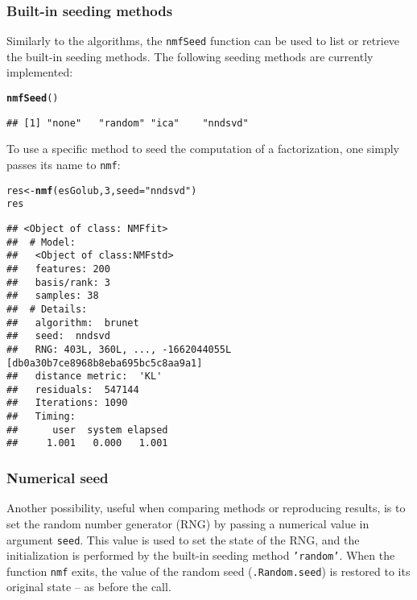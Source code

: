 \documentclass[a4paper]{article}\usepackage{graphicx, color}
\makeatletter
\newcommand{\hlfunctioncall}[1]{\textcolor[rgb]{0.501960784313725,0,0.329411764705882}{\textbf{#1}}}%
\newcommand{\hlstring}[1]{\textcolor[rgb]{0.6,0.6,1}{#1}}%
\newenvironment{kframe}{%
 \def\at@end@of@kframe{}%
 \ifinner\ifhmode%
  \def\at@end@of@kframe{\end{minipage}}%
  \begin{minipage}{\columnwidth}%
 \fi\fi%
 \def\FrameCommand##1{\hskip\@totalleftmargin \hskip-\fboxsep
 \colorbox{shadecolor}{##1}\hskip-\fboxsep
     \hskip-\linewidth \hskip-\@totalleftmargin \hskip\columnwidth}%
 \MakeFramed {\advance\hsize-\width
   \@totalleftmargin\z@ \linewidth\hsize
   \@setminipage}}%
 {\par\unskip\endMakeFramed%
 \at@end@of@kframe}
\newenvironment{knitrout}{}{} %
\let\code=\texttt
\makeatother
\begin{document}
\subsubsection{Built-in seeding methods}
Similarly to the algorithms, the \code{nmfSeed} function can be used to list or retrieve the built-in seeding methods.
The following seeding methods are currently implemented:

\begin{knitrout}
\color{fgcolor}\begin{kframe}
\begin{alltt}
\hlfunctioncall{nmfSeed}()
\end{alltt}
\begin{verbatim}
## [1] "none"   "random" "ica"    "nndsvd"
\end{verbatim}
\end{kframe}
\end{knitrout}


To use a specific method to seed the computation of a factorization, one simply passes its name to \code{nmf}:

\begin{knitrout}
\color{fgcolor}\begin{kframe}
\begin{alltt}
res <- \hlfunctioncall{nmf}(esGolub, 3, seed = \hlstring{"nndsvd"})
res
\end{alltt}
\begin{verbatim}
## <Object of class: NMFfit>
##  # Model:
##   <Object of class:NMFstd>
##   features: 200 
##   basis/rank: 3 
##   samples: 38 
##  # Details:
##   algorithm:  brunet 
##   seed:  nndsvd 
##   RNG: 403L, 360L, ..., -1662044055L [db0a30b7ce8968b8eba695bc5c8aa9a1]
##   distance metric:  'KL' 
##   residuals:  547144 
##   Iterations: 1090 
##   Timing:
##      user  system elapsed 
##     1.001   0.000   1.001
\end{verbatim}
\end{kframe}
\end{knitrout}


\subsubsection{Numerical seed}\label{sec:numseed}
Another possibility, useful when comparing methods or reproducing results, is to set the random number generator (RNG) by passing a numerical value in argument \code{seed}.
This value is used to set the state of the RNG, and the initialization is performed by the built-in seeding method \code{'random'}.
When the function \code{nmf} exits, the value of the random seed (\code{.Random.seed}) is restored to its original state -- as before the call.
\end{document}
